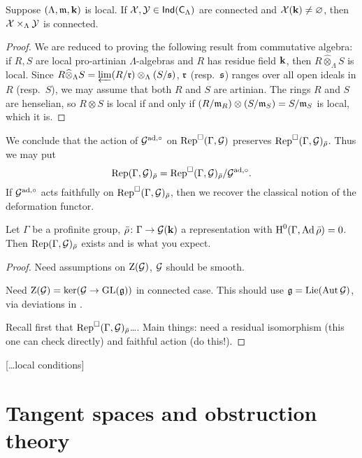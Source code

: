 \begin{theorem}
Suppose $(\Lambda,\mathfrak{m},\mathbf{k})$ is local. If $\mathcal{X},\mathcal{Y}\in \operatorname{\mathsf{Ind}}(\mathsf{C}_\Lambda)$ are 
connected and $\mathcal{X}(\mathbf{k})\ne\varnothing$, then $\mathcal{X}\times_\Lambda \mathcal{Y}$ is 
connected. 
\end{theorem}
\begin{proof}
We are reduced to proving the following result from commutative algebra: if 
$R,S$ are local pro-artinian $\Lambda$-algebras and $R$ has residue field 
$\mathbf{k}$, then $R\widehat\otimes_\Lambda S$ is local. Since 
$R\widehat\otimes_\Lambda S = \varprojlim (R/\mathfrak{r})\otimes_\Lambda (S/\mathfrak{s})$, 
$\mathfrak{r}$ (resp.~$\mathfrak{s}$) ranges over all open ideals in $R$ (resp.~$S$), we may 
assume that both $R$ and $S$ are artinian. The rings $R$ and $S$ are 
henselian, so $R\otimes S$ is local if and only if 
$(R/\mathfrak{m}_R)\otimes (S/\mathfrak{m}_S) = S/\mathfrak{m}_S$ is local, which it is. 
\end{proof}

We conclude that the action of $\mathcal{G}^{\mathrm{ad},\circ}$ on $\operatorname{Rep}^\square(\Gamma,\mathcal{G})$ 
preserves $\operatorname{Rep}^\square(\Gamma,\mathcal{G})_{\bar\rho}$. Thus we may put 
\[
	\operatorname{Rep}(\Gamma,\mathcal{G})_{\bar\rho} = \operatorname{Rep}^\square(\Gamma,\mathcal{G})_{\bar\rho} / \mathcal{G}^{\mathrm{ad},\circ} .
\]
If $\mathcal{G}^{\mathrm{ad},\circ}$ acts faithfully on $\operatorname{Rep}^\square(\Gamma,\mathcal{G})_{\bar\rho}$, 
then we recover the classical notion of the deformation functor. 

\begin{theorem}
Let $\Gamma$ be a profinite group, $\bar\rho\colon \Gamma\to \mathcal{G}(\mathbf{k})$ a 
representation with $\operatorname{H}^0(\Gamma,\operatorname{Ad}\bar\rho)=0$. Then 
$\operatorname{Rep}(\Gamma,\mathcal{G})_{\bar\rho}$ exists and is what you expect. 
\end{theorem}
\begin{proof}
Need assumptions on $\operatorname{Z}(\mathcal{G})$, $\mathcal{G}$ should be smooth. 

Need $\operatorname{Z}(\mathcal{G})=\ker(\mathcal{G}\to \operatorname{GL}(\mathfrak{g}))$ in connected case. This should use 
$\mathfrak{g}=\operatorname{Lie}(\operatorname{Aut} \mathcal{G})$, via deviations in \cite{sga3-1}. 

Recall first that $\operatorname{Rep}^\square(\Gamma,\mathcal{G})_{\bar\rho}$\ldots. Main things: 
need a residual isomorphism (this one can check directly) and faithful 
action (do this!). 
\end{proof}

[\ldots local conditions]





\section{Tangent spaces and obstruction theory}

